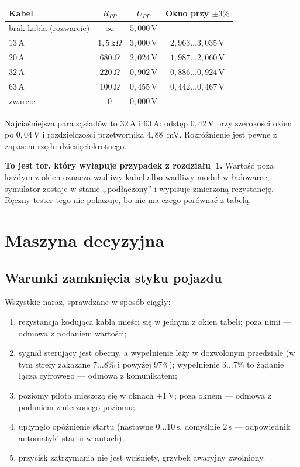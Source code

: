 \documentclass[a4paper,11pt]{article}
\newcommand{\ohm}{\,\Omega}
\newcommand{\kohm}{\,\mathrm{k}\Omega}
\newcommand{\volt}{\,\mathrm{V}}
\newcommand{\amp}{\,\mathrm{A}}
\newcommand{\sek}{\,\mathrm{s}}
\begin{document}
\begin{center}
\begin{tabular}{lccc}
\toprule
Kabel & $R_{PP}$ & $U_{PP}$ & Okno przy $\pm3\%$ \\
\midrule
brak kabla (rozwarcie) & $\infty$        & $5{,}000\volt$ & --- \\
$13\amp$               & $1{,}5\kohm$    & $3{,}000\volt$ & $2{,}963\ldots3{,}035\volt$ \\
$20\amp$               & $680\ohm$       & $2{,}024\volt$ & $1{,}987\ldots2{,}060\volt$ \\
$32\amp$               & $220\ohm$       & $0{,}902\volt$ & $0{,}886\ldots0{,}924\volt$ \\
$63\amp$               & $100\ohm$       & $0{,}455\volt$ & $0{,}442\ldots0{,}467\volt$ \\
zwarcie                & $0$             & $0{,}000\volt$ & --- \\
\bottomrule
\end{tabular}
\end{center}

Najciaśniejsza para sąsiadów to $32\amp$ i $63\amp$: odstęp $0{,}42\volt$ przy
szerokości okien po $0{,}04\volt$ i rozdzielczości przetwornika $4{,}88$~mV.
Rozróżnienie jest pewne z zapasem rzędu dziesięciokrotnego.

\textbf{To jest tor, który wyłapuje przypadek z rozdziału~1.} Wartość poza każdym
z okien oznacza wadliwy kabel albo wadliwy moduł w ładowarce, symulator zostaje
w stanie ,,podłączony'' i wypisuje zmierzoną rezystancję. Ręczny tester tego nie
pokazuje, bo nie ma czego porównać z tabelą.

\section{Maszyna decyzyjna}
\label{sec:maszyna}

\subsection{Warunki zamknięcia styku pojazdu}

Wszystkie naraz, sprawdzane w sposób ciągły:

\begin{enumerate}
\item rezystancja kodująca kabla mieści się w jednym z okien tabeli; poza nimi ---
      odmowa z podaniem wartości;
\item sygnał sterujący jest obecny, a wypełnienie leży w dozwolonym przedziale
      (w tym strefy zakazane $7\ldots8\%$ i powyżej $97\%$); wypełnienie
      $3\ldots7\%$ to żądanie łącza cyfrowego --- odmowa z komunikatem;
\item poziomy pilota mieszczą się w oknach $\pm1\volt$; poza oknem --- odmowa
      z podaniem zmierzonego poziomu;
\item upłynęło opóźnienie startu (nastawne $0\ldots10\sek$, domyślnie $2\sek$ ---
      odpowiednik automatyki startu w autach);
\item przycisk zatrzymania nie jest wciśnięty, grzybek awaryjny zwolniony.
\end{enumerate}
\end{document}
